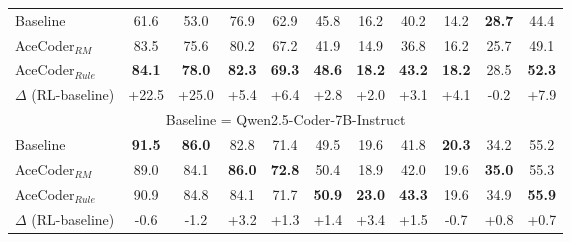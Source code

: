 \begin{table*}[!t]
{\begin{tabular}{lcccccccccc}
\midrule
Baseline & 61.6 & 53.0 & 76.9 & 62.9 & 45.8 & 16.2 & 40.2 & 14.2 & \textbf{28.7} & 44.4 \\
AceCoder$_{RM}$ & 83.5 & 75.6 & 80.2 & 67.2 & 41.9 & 14.9 & 36.8 & 16.2 & 25.7 & 49.1 \\
AceCoder$_{Rule}$ & \textbf{84.1} & \textbf{78.0} & \textbf{82.3} & \textbf{69.3} & \textbf{48.6} & \textbf{18.2} & \textbf{43.2} & \textbf{18.2} & 28.5 & \textbf{52.3} \\
 \rowcolor{LightCyan}
$\Delta$ (RL-baseline) & +22.5 & +25.0 & +5.4 & +6.4 & +2.8 & +2.0 & +3.1 & +4.1 & -0.2 & +7.9 \\
 \midrule
 \multicolumn{11}{c}{Baseline = Qwen2.5-Coder-7B-Instruct} \\
\midrule
Baseline & \textbf{91.5} & \textbf{86.0} & 82.8 & 71.4 & 49.5 & 19.6 & 41.8 & \textbf{20.3} & 34.2 & 55.2 \\
AceCoder$_{RM}$ & 89.0 & 84.1 & \textbf{86.0} & \textbf{72.8} & 50.4 & 18.9 & 42.0 & 19.6 & \textbf{35.0} & 55.3 \\
AceCoder$_{Rule}$ & 90.9 & 84.8 & 84.1 & 71.7 & \textbf{50.9} & \textbf{23.0} & \textbf{43.3} & 19.6 & 34.9 & \textbf{55.9} \\
 \rowcolor{LightCyan}
$\Delta$ (RL-baseline) & -0.6 & -1.2 & +3.2 & +1.3 & +1.4 & +3.4 & +1.5 & -0.7 & +0.8 & +0.7 \\
\bottomrule
\end{tabular}
}
\end{table*}
